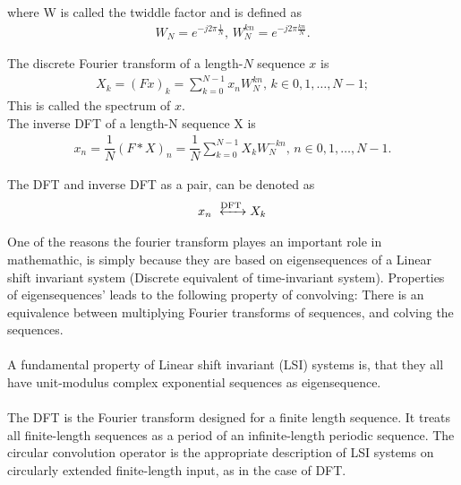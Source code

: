 where W is called the twiddle factor and is defined as \cite{DFT_OX}
\begin{align*}
	W_N = e^{-j 2 \pi\frac{1}{N}}, \, W_N^{kn} = e^{-j 2 \pi\frac{kn}{N}}.
\end{align*}

\begin{definition}
The discrete Fourier transform of a length-$N$ sequence $x$ is 
\begin{align} \label{eq:def_DFT}
	X_k = (Fx)_k = \sum_{k=0}^{N-1} x_n W_N^{kn}, \, k\in {0, 1, \dots, N-1};
\end{align}
This is called the spectrum of $x$.\\
The inverse DFT of a length-N sequence X is
\begin{align*}
	x_n = \dfrac{1}{N}(F*X)_n = \dfrac{1}{N}\sum_{k=0}^{N-1} X_k W_N^{-kn}, \, n \in {0, 1, \dots, N-1}.
\end{align*}

The DFT and inverse DFT as a pair, can be denoted as 
\begin{align*}
	x_n \xleftrightarrow{\text{DFT}} X_k
\end{align*}
\end{definition} 
\cite{FSP}

One of the reasons the fourier transform playes an important role in mathemathic, is simply because they are based on eigensequences of a Linear shift invariant system (Discrete equivalent of time-invariant system). 
 Properties of eigensequences' leads to the following property of convolving:
There is an equivalence between multiplying Fourier transforms of sequences, and colving the sequences.
\\\\
 A fundamental property of Linear shift invariant (LSI) systems is, that they all have unit-modulus complex exponential sequences as eigensequence. \cite{FSP}
\\\\
The DFT is the Fourier transform designed for a finite length sequence.
It treats all finite-length sequences as a period of an infinite-length periodic sequence.
The circular convolution operator is the appropriate description of LSI systems on circularly extended finite-length input, as in the case of DFT.  

